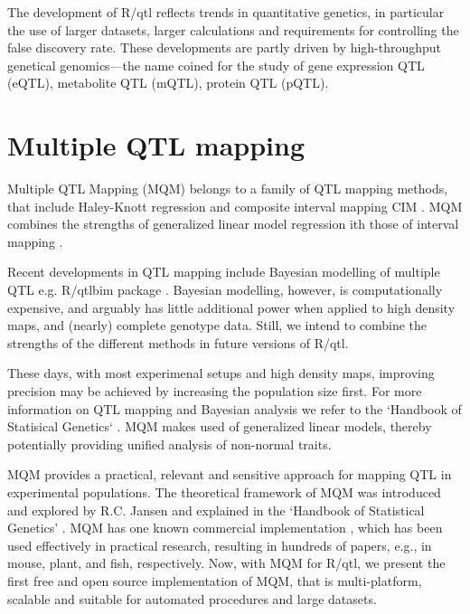 \documentclass[8pt, twoside, a5paper]{report}
\begin{document}
The development of R/qtl reflects trends in quantitative genetics, in particular the use of larger datasets, larger 
calculations and requirements for controlling the false discovery rate. These developments are partly driven by 
high-throughput genetical genomics---the name coined for the study of gene expression QTL (eQTL)\cite{Jansen:2001}, 
metabolite QTL (mQTL), protein QTL (pQTL).

\section{Multiple QTL mapping}

Multiple QTL Mapping (MQM) belongs to a family of QTL mapping methods, that include Haley-Knott regression
\cite{Haley:1992} and composite interval mapping CIM \cite{Zeng:1994}. MQM combines the strengths of generalized 
linear model regression ith those of interval mapping \cite{Jansen:1993, Jansen:1994b}. 

Recent developments in QTL mapping include Bayesian modelling of multiple QTL e.g. R/qtlbim package
\cite{Yandell:2007, Banerjee:2008}. Bayesian modelling, however, is computationally expensive, and arguably has 
little additional power when applied to high density maps, and (nearly) complete genotype data\cite{Handbook:Jansen:2007}. 
Still, we intend to combine the strengths of the different methods in future versions of R/qtl.

These days, with most experimenal setups and high density maps, improving precision may be achieved by increasing 
the population size first. For more information on QTL mapping and Bayesian analysis we refer to the `Handbook of 
Statisical Genetics` \cite{Handbook:2007}. MQM makes used of generalized linear models, thereby potentially 
providing unified analysis of non-normal traits.

MQM provides a practical, relevant and sensitive approach for mapping QTL in experimental populations. The 
theoretical framework of MQM was introduced and explored by R.C. Jansen\cite{Jansen:1994a} and explained in the 
`Handbook of Statistical Genetics' \cite{Handbook:Jansen:2007}. MQM has one known commercial implementation
\cite{Mapqtl:2002}, which has been used effectively in practical research, resulting in hundreds of papers, e.g., 
in mouse, plant, and fish, respectively\cite{DeMooij:2009, Jeuken:2009, Kitano:2009}.  Now, with MQM for R/qtl, 
we present the first free and open source implementation of MQM, that is multi-platform, scalable and suitable 
for automated procedures and large datasets.
\end{document}
